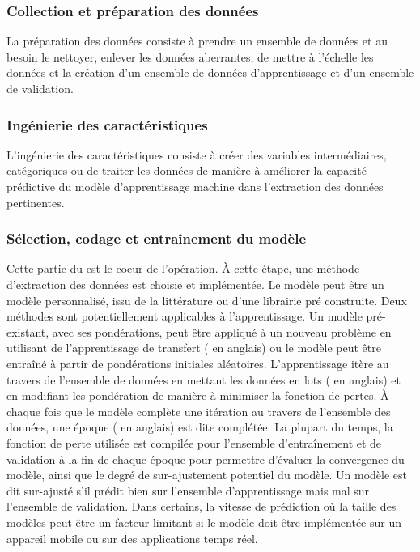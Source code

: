     \subsubsection{Collection et préparation des données}
        La préparation des données consiste à prendre un ensemble de données et au besoin le nettoyer, enlever les données aberrantes, de mettre à l'échelle les données et la création d'un ensemble de données d'apprentissage et d'un ensemble de validation.
    \subsubsection{Ingénierie des caractéristiques}
      L'ingénierie des caractéristiques consiste à créer des variables intermédiaires, catégoriques ou de traiter les données de manière à améliorer la capacité prédictive du modèle d'apprentissage machine dans l'extraction des données pertinentes.
    \subsubsection{Sélection, codage et entraînement du modèle}
      Cette partie du  \fg{} est le coeur de l'opération. À cette étape, une méthode d'extraction des données est choisie et implémentée. Le modèle peut être un modèle personnalisé, issu de la littérature ou d'une librairie pré construite. Deux méthodes sont potentiellement applicables à l'apprentissage. Un modèle pré-existant, avec ses pondérations, peut être appliqué à un nouveau problème en utilisant de l'apprentissage de transfert ( \fg{} en anglais) ou le modèle peut être entraîné à partir de pondérations initiales aléatoires. L'apprentissage itère au travers de l'ensemble de données en mettant les données en lots ( \fg{} en anglais) et en modifiant les pondération de manière à minimiser la fonction de pertes. À chaque fois que le modèle complète une itération au travers de l'ensemble des données, une époque ( \fg{} en anglais) est dite complétée. La plupart du temps, la fonction de perte utilisée est compilée pour l'ensemble d’entraînement et de validation à la fin de chaque époque pour permettre d'évaluer la convergence du modèle, ainsi que le degré de sur-ajustement potentiel du modèle. Un modèle est dit sur-ajusté s'il prédit bien sur l'ensemble d’apprentissage mais mal sur l'ensemble de validation. Dans certains, la vitesse de prédiction où la taille des modèles peut-être un facteur limitant si le modèle doit être implémentée sur un appareil mobile ou sur des applications temps réel.
